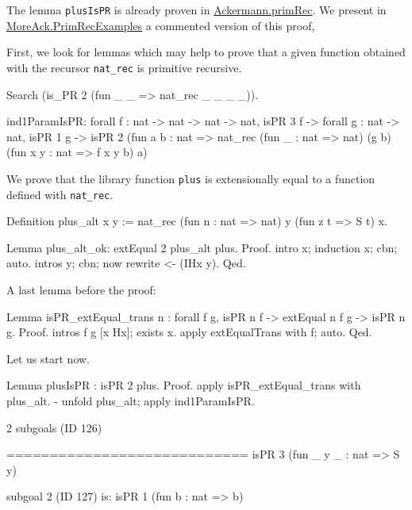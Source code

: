The lemma \texttt{plusIsPR} is already proven in \href{../theories/html/hydras.primRec.html}{Ackermann.primRec}. We present in 
\href{../theories/html/hydras.MoreAck.PrimRecExamples.html}{MoreAck.PrimRecExamples}
a commented version of this proof, 

First, we look for lemmas which may help to prove that a given function obtained with the recursor \texttt{nat\_rec} is primitive recursive.

\begin{Coqsrc}
Search (is_PR 2 (fun _ _ => nat_rec _ _ _ _)).
\end{Coqsrc}

\begin{Coqanswer}
ind1ParamIsPR:
  forall f : nat -> nat -> nat -> nat,
  isPR 3 f ->
  forall g : nat -> nat,
  isPR 1 g ->
  isPR 2
    (fun a b : nat =>
     nat_rec (fun _ : nat => nat)
                 (g b) (fun x y : nat => f x y b) a)
\end{Coqanswer}

We prove that the library function \texttt{plus} is extensionally equal to a function defined with
\texttt{nat\_rec}.

\begin{Coqsrc}
Definition plus_alt x y  :=
              nat_rec  (fun n : nat => nat)
                       y
                       (fun z t =>  S t)
                       x.

Lemma plus_alt_ok:
  extEqual 2 plus_alt plus.
Proof.
  intro x; induction x; cbn; auto.
  intros y; cbn; now rewrite <- (IHx y).
Qed.
\end{Coqsrc}

A last lemma before the proof:

\begin{Coqsrc}
Lemma isPR_extEqual_trans n : forall f g, isPR n f ->
                                    extEqual n f g ->
                                    isPR n g.
Proof.
 intros f g [x Hx]; exists x.
 apply extEqualTrans with f; auto.
Qed.
\end{Coqsrc}

Let us start now.

\begin{Coqsrc}
Lemma plusIsPR : isPR 2 plus.
Proof.
  apply isPR_extEqual_trans with plus_alt.
  - unfold plus_alt; apply ind1ParamIsPR.
\end{Coqsrc}

\begin{Coqanswer}
2 subgoals (ID 126)
  
  ============================
  isPR 3 (fun _ y _ : nat => S y)

subgoal 2 (ID 127) is:
 isPR 1 (fun b : nat => b)
\end{Coqanswer}

